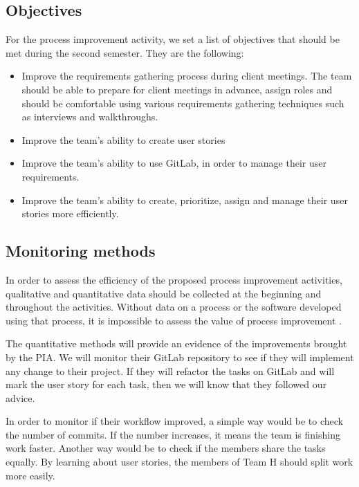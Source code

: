 \documentclass[11pt]{article}
\begin{document}
\subsection*{Objectives}

For the process improvement activity, we set a list of objectives that should be met during the second semester. They are the following:

\begin{itemize}
 
    \item Improve the requirements gathering process during client meetings. The team should be able to prepare for client meetings in advance, assign roles and should be comfortable using various requirements gathering techniques such as interviews and walkthroughs.
    \item Improve the team's ability to create user stories 
    \item Improve the team's ability to use GitLab, in order to manage their user requirements.
    \item Improve the team's ability to create, prioritize, assign and manage their user stories more efficiently.
\end{itemize}


\subsection*{Monitoring methods}

\par
In order to assess the efficiency of the proposed process improvement activities, qualitative and quantitative data should be collected at the beginning and throughout the activities. Without data on a process or the software developed using that process, it is impossible to assess the value of process improvement \citet[Chapter~26]{softengbook}. 

\par
The quantitative methods will provide an evidence of the improvements brought by the PIA. We will monitor their GitLab repository to see if they will implement any change to their project. If they will refactor the tasks on GitLab and will mark the user story for each task, then we will know that they followed our advice. 
\par
In order to monitor if their workflow improved, a simple way would be to check the number of commits.   If the number increases, it means the team is finishing work faster. Another way would be to check if the members share the tasks equally. By learning about user stories, the members of Team H should split work more easily.
\end{document}
